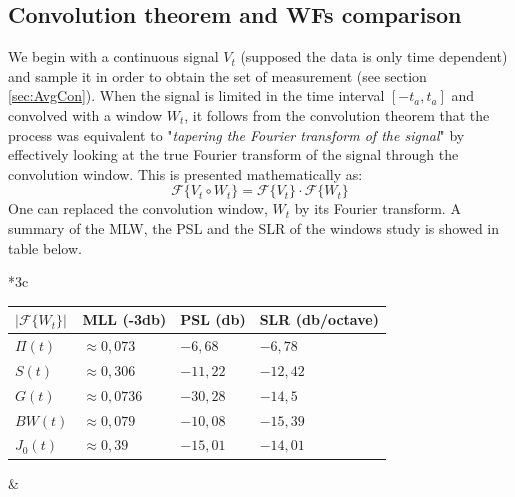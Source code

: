 \documentclass[useAMS,usenatbib]{mn2e}
\begin{document}
\subsection{Convolution theorem and WFs comparison}
We begin with a continuous signal $V_{t}$ (supposed the data is only time dependent) and sample it in order to obtain the set of 
measurement (see section \ref{sec:AvgCon}). When the signal is limited in the time interval $[-t_a,t_a]$ and convolved with a window 
$W_{t}$, it 
follows from the convolution theorem that the process was equivalent to "\textit{tapering the  Fourier transform of the signal}" by 
effectively looking at the true Fourier transform of the signal through the convolution window. This is presented mathematically as:
\begin{equation}
\mathcal{F}\Big\{V_{t}\circ W_{t}\Big\} = \mathcal{F}\Big\{V_{t}\Big\}\cdot \mathcal{F}\Big\{W_{t}\Big\}
\end{equation}
One can replaced the convolution window, $W_{t}$ by its Fourier transform. A summary of the MLW, the PSL and 
the SLR of the windows study is showed in table below.

\begin{tabular}{*3{c}}
 \\
 \hspace{-1cm}\begin{tabular}{|l|l|l|l|}
  \hline
  \footnotesize $|\mathcal{F}\Big\{W_{t}\Big\}|$ &\textbf{\footnotesize MLL (-3db)}&\textbf{\footnotesize PSL (db)} &\textbf{\footnotesize 
SLR (db/octave) }  \\
  \hline\hline
  {\footnotesize $\Pi(t)$} &{\footnotesize $\approx 0,073$} &{\footnotesize $-6,68$}&{\footnotesize 
$-6,78$}\\
  {\footnotesize $S(t)$} &{\footnotesize  $\approx0,306$}&{\footnotesize  $-11,22$}&{\footnotesize  
$-12,42$} \\
  {\footnotesize $G(t)$} & {\footnotesize $\approx0,0736$}&{\footnotesize  $-30,28$}&{\footnotesize  $-14,5$}\\ 
  {\footnotesize $BW(t)$} &{\footnotesize  $\approx0,079$} &{\footnotesize $-10,08$ }&{\footnotesize  $-15,39$}\\
  {\footnotesize $J_0(t)$} &{\footnotesize  $\approx 0,39$} &{\footnotesize $ -15,01$ }&{\footnotesize  $ -14,01$}
  \end{tabular}& \label{BDWBnoise}
\end{tabular}\\
\\
\end{document}

